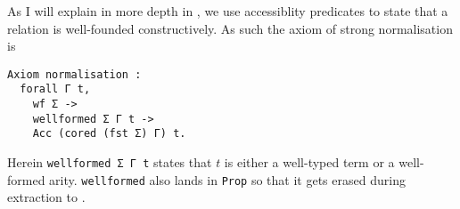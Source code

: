 As I will explain in more depth in , we use accessiblity
predicates to state that a relation is well-founded constructively.
As such the axiom of strong normalisation is
\begin{verbatim}
Axiom normalisation :
  forall Γ t,
    wf Σ ->
    wellformed Σ Γ t ->
    Acc (cored (fst Σ) Γ) t.
\end{verbatim}
Herein \texttt{wellformed Σ Γ t} states that \(t\) is either a
well-typed term or a well-formed arity. \texttt{wellformed} also lands
in \texttt{Prop} so that it gets erased during extraction to \ocaml.
